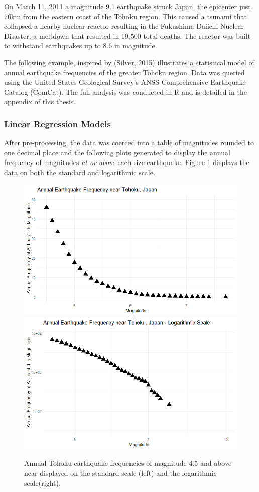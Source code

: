 
On March 11, 2011 a magnitude 9.1 earthquake struck Japan, the epicenter just 76km from the eastern coast of the Tohoku region.  This caused a tsunami that collapsed a nearby nuclear reactor resulting in the Fukushima Daiichi Nuclear Disaster, a meltdown that resulted in 19,500 total deaths.  The reactor was built to withstand earthquakes up to 8.6 in magnitude.

The following example, inspired by (Silver, 2015)\cite{silver2015signal} illustrates a statistical model of annual earthquake frequencies of the greater Tohoku region.
Data was queried using the United States Geological Survey's ANSS Comprehensive Earthquake Catalog (ComCat).  The full analysis was conducted in R and is detailed in the appendix of this thesis.



\subsubsection{Linear Regression Models}
After pre-processing, the data was coerced into a table of magnitudes rounded to one decimal place and the following plots generated to display the annual frequency of magnitudes \textit{at or above} each size earthquake.  Figure \ref{tohoku_unfit} displays the data on both the standard and logarithmic scale.

\begin{figure}[H]
    \includegraphics[width=0.5\linewidth]{Figures/tohoku_standardscale.png}
    \includegraphics[width=0.5\linewidth]{Figures/tohoku_logscale.png}
    \caption{\footnotesize{Annual Tohoku earthquake frequencies of magnitude 4.5 and above near displayed on the standard scale (left) and the logarithmic scale(right).}}
    \label{tohoku_unfit}
\end{figure}



